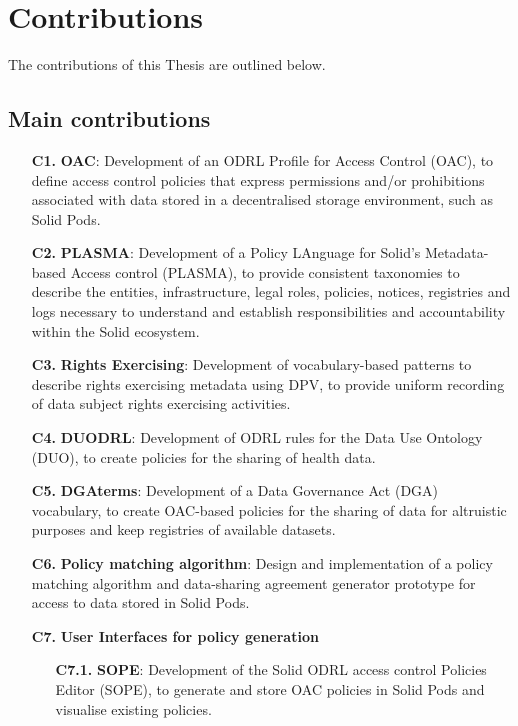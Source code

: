 \section{Contributions}
\label{sec:contributions}

The contributions of this Thesis are outlined below.

\subsection{Main contributions}
\label{sec:contr_main}

\begin{enumerate}
    \item [\textbf{C1.}] \textbf{OAC}: Development of an ODRL Profile for Access Control (OAC), to define access control policies that express permissions and/or prohibitions associated with data stored in a decentralised storage environment, such as Solid Pods.
    \item [\textbf{C2.}] \textbf{PLASMA}: Development of a Policy LAnguage for Solid’s Metadata-based Access control (PLASMA), to provide consistent taxonomies to describe the entities, infrastructure, legal roles, policies, notices, registries and logs necessary to understand and establish responsibilities and accountability within the Solid ecosystem.
    \item [\textbf{C3.}] \textbf{Rights Exercising}: Development of vocabulary-based patterns to describe rights exercising metadata using DPV, to provide uniform recording of data subject rights exercising activities.
    \item [\textbf{C4.}] \textbf{DUODRL}: Development of ODRL rules for the Data Use Ontology (DUO), to create policies for the sharing of health data.
    \item [\textbf{C5.}] \textbf{DGAterms}: Development of a Data Governance Act (DGA) vocabulary, to create OAC-based policies for the sharing of data for altruistic purposes and keep registries of available datasets.
    \item [\textbf{C6.}] \textbf{Policy matching algorithm}: Design and implementation of a policy matching algorithm and data-sharing agreement generator prototype for access to data stored in Solid Pods.
    \item [\textbf{C7.}] \textbf{User Interfaces for policy generation}
    \begin{enumerate}
    \item [\textbf{C7.1.}] \textbf{SOPE}: Development of the Solid ODRL access control Policies Editor (SOPE), to generate and store OAC policies in Solid Pods and visualise existing policies.

\end{enumerate}
\end{enumerate}
